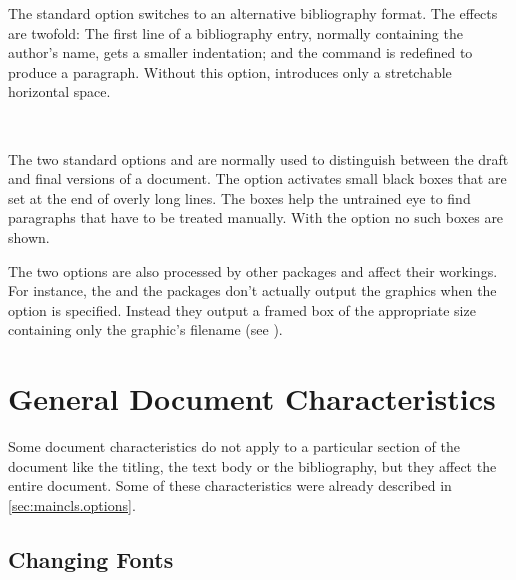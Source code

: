 \begin{Declaration}
\end{Declaration}%
%
The standard option  switches to an alternative
bibliography format. The effects are twofold: The first line of a
bibliography entry, normally containing the author's name, gets a
smaller indentation; and the command  is redefined to
produce a paragraph. Without this option,  introduces
only a stretchable horizontal space.
%


\begin{Declaration}
  \\
\end{Declaration}%
%
%
The two standard options  and  are
normally used to distinguish between the draft and final versions of a
document. The option  activates small black boxes that
are set at the end of overly long lines. The boxes help the untrained
eye to find paragraphs that have to be treated manually. With the
 option no such boxes are shown.

The two options are also processed by other packages and affect their
workings. For instance, the 
and the  packages don't
actually output the graphics when the option  is
specified. Instead they output a framed box of the appropriate size
containing only the graphic's filename (see \cite{package:graphics}).
%
%
%


\section{General Document Characteristics}
\label{sec:maincls.general}

Some document characteristics do not apply to a particular section of
the document like the titling, the text body or the bibliography, but
they affect the entire document. Some of these characteristics were
already described in \autoref{sec:maincls.options}.

\subsection{Changing Fonts}
\label{sec:maincls.font}

